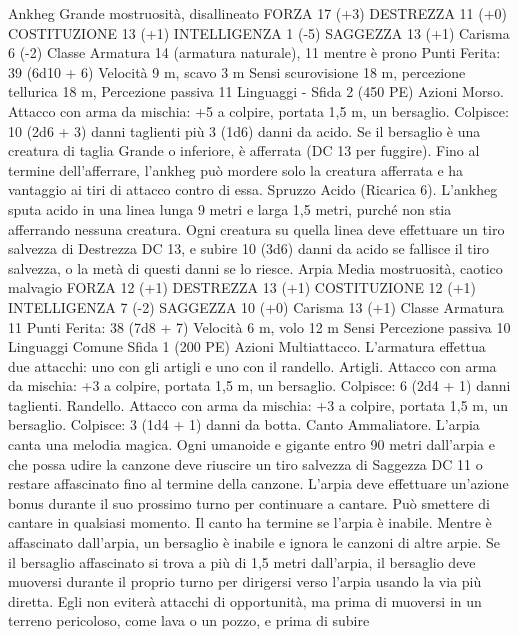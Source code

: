 \begin{multicols}{2}
Ankheg
Grande mostruosità, disallineato
FORZA 17 (+3)
DESTREZZA 11 (+0)
COSTITUZIONE 13 (+1)
INTELLIGENZA 1 (-5)
SAGGEZZA 13 (+1)
Carisma 6 (-2)
Classe Armatura 14 (armatura naturale), 11 mentre è prono
\hspace*{0pt}\hfill{Punti Ferita}: 39 (6d10 + 6)
Velocità 9 m, scavo 3 m
Sensi scurovisione 18 m, percezione tellurica 18 m, Percezione
passiva 11
Linguaggi -
Sfida 2 (450 PE)
Azioni
Morso. Attacco con arma da mischia: +5 a colpire, portata 1,5
m, un bersaglio.
Colpisce: 10 (2d6 + 3) danni taglienti più 3 (1d6) danni da acido.
Se il bersaglio è una creatura di taglia Grande o inferiore, è
afferrata (DC 13 per fuggire). Fino al termine dell’afferrare,
l’ankheg può mordere solo la creatura afferrata e ha vantaggio ai
tiri di attacco contro di essa.
Spruzzo Acido (Ricarica 6). L’ankheg sputa acido in una linea
lunga 9 metri e larga 1,5 metri, purché non stia afferrando
nessuna creatura. Ogni creatura su quella linea deve effettuare un
tiro salvezza di Destrezza DC 13, e subire 10 (3d6) danni da
acido se fallisce il tiro salvezza, o la metà di questi danni se lo
riesce.
Arpia
Media mostruosità, caotico malvagio
FORZA 12 (+1)
DESTREZZA 13 (+1)
COSTITUZIONE 12 (+1)
INTELLIGENZA 7 (-2)
SAGGEZZA 10 (+0)
Carisma 13 (+1)
Classe Armatura 11
\hspace*{0pt}\hfill{Punti Ferita}: 38 (7d8 + 7)
Velocità 6 m, volo 12 m
Sensi Percezione passiva 10
Linguaggi Comune
Sfida 1 (200 PE)
Azioni
Multiattacco. L’armatura effettua due attacchi: uno con gli
artigli e uno con il randello.
Artigli. Attacco con arma da mischia: +3 a colpire, portata 1,5
m, un bersaglio.
Colpisce: 6 (2d4 + 1) danni taglienti.
Randello. Attacco con arma da mischia: +3 a colpire, portata 1,5
m, un bersaglio.
Colpisce: 3 (1d4 + 1) danni da botta.
Canto Ammaliatore. L’arpia canta una melodia magica. Ogni
umanoide e gigante entro 90 metri dall’arpia e che possa udire la
canzone deve riuscire un tiro salvezza di Saggezza DC 11 o
restare affascinato fino al termine della canzone. L’arpia deve
effettuare un’azione bonus durante il suo prossimo turno per
continuare a cantare. Può smettere di cantare in qualsiasi
momento. Il canto ha termine se l’arpia è inabile.
Mentre è affascinato dall’arpia, un bersaglio è inabile e ignora le
canzoni di altre arpie. Se il bersaglio affascinato si trova a più di
1,5 metri dall’arpia, il bersaglio deve muoversi durante il proprio
turno per dirigersi verso l’arpia usando la via più diretta. Egli
non eviterà attacchi di opportunità, ma prima di muoversi in un
terreno pericoloso, come lava o un pozzo, e prima di subire

\end{multicols}
